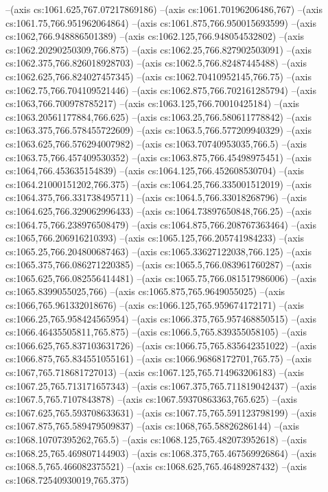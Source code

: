 --(axis cs:1061.625,767.07217869186)
--(axis cs:1061.70196206486,767)
--(axis cs:1061.75,766.951962064864)
--(axis cs:1061.875,766.950015693599)
--(axis cs:1062,766.948886501389)
--(axis cs:1062.125,766.948054532802)
--(axis cs:1062.20290250309,766.875)
--(axis cs:1062.25,766.827902503091)
--(axis cs:1062.375,766.826018928703)
--(axis cs:1062.5,766.82487445488)
--(axis cs:1062.625,766.824027457345)
--(axis cs:1062.70410952145,766.75)
--(axis cs:1062.75,766.704109521446)
--(axis cs:1062.875,766.702161285794)
--(axis cs:1063,766.700978785217)
--(axis cs:1063.125,766.70010425184)
--(axis cs:1063.20561177884,766.625)
--(axis cs:1063.25,766.580611778842)
--(axis cs:1063.375,766.578455722609)
--(axis cs:1063.5,766.577209940329)
--(axis cs:1063.625,766.576294007982)
--(axis cs:1063.70740953035,766.5)
--(axis cs:1063.75,766.457409530352)
--(axis cs:1063.875,766.45498975451)
--(axis cs:1064,766.453635154839)
--(axis cs:1064.125,766.452608530704)
--(axis cs:1064.21000151202,766.375)
--(axis cs:1064.25,766.335001512019)
--(axis cs:1064.375,766.331738495711)
--(axis cs:1064.5,766.33018268796)
--(axis cs:1064.625,766.329062996433)
--(axis cs:1064.73897650848,766.25)
--(axis cs:1064.75,766.238976508479)
--(axis cs:1064.875,766.208767363464)
--(axis cs:1065,766.206916210393)
--(axis cs:1065.125,766.205741984233)
--(axis cs:1065.25,766.204800687463)
--(axis cs:1065.33627122038,766.125)
--(axis cs:1065.375,766.086271220385)
--(axis cs:1065.5,766.083961760287)
--(axis cs:1065.625,766.082556414481)
--(axis cs:1065.75,766.081517986006)
--(axis cs:1065.8399055025,766)
--(axis cs:1065.875,765.9649055025)
--(axis cs:1066,765.961332018676)
--(axis cs:1066.125,765.959674172171)
--(axis cs:1066.25,765.958424565954)
--(axis cs:1066.375,765.957468850515)
--(axis cs:1066.46435505811,765.875)
--(axis cs:1066.5,765.839355058105)
--(axis cs:1066.625,765.837103631726)
--(axis cs:1066.75,765.835642351022)
--(axis cs:1066.875,765.834551055161)
--(axis cs:1066.96868172701,765.75)
--(axis cs:1067,765.718681727013)
--(axis cs:1067.125,765.714963206183)
--(axis cs:1067.25,765.713171657343)
--(axis cs:1067.375,765.711819042437)
--(axis cs:1067.5,765.7107843878)
--(axis cs:1067.59370863363,765.625)
--(axis cs:1067.625,765.593708633631)
--(axis cs:1067.75,765.591123798199)
--(axis cs:1067.875,765.589479509837)
--(axis cs:1068,765.58826286144)
--(axis cs:1068.10707395262,765.5)
--(axis cs:1068.125,765.482073952618)
--(axis cs:1068.25,765.469807144903)
--(axis cs:1068.375,765.467569926864)
--(axis cs:1068.5,765.466082375521)
--(axis cs:1068.625,765.46489287432)
--(axis cs:1068.72540930019,765.375)
